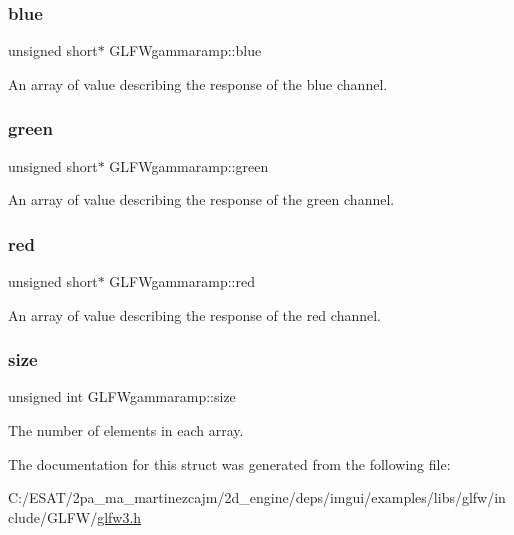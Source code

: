 \subsubsection{\texorpdfstring{blue}{blue}}
{\footnotesize\ttfamily unsigned short$\ast$ G\+L\+F\+Wgammaramp\+::blue}

An array of value describing the response of the blue channel. \mbox{\label{struct_g_l_f_wgammaramp_affccc6f5df47820b6562d709da3a5a3a}} 
\subsubsection{\texorpdfstring{green}{green}}
{\footnotesize\ttfamily unsigned short$\ast$ G\+L\+F\+Wgammaramp\+::green}

An array of value describing the response of the green channel. \mbox{\label{struct_g_l_f_wgammaramp_a2cce5d968734b685623eef913e635138}} 
\subsubsection{\texorpdfstring{red}{red}}
{\footnotesize\ttfamily unsigned short$\ast$ G\+L\+F\+Wgammaramp\+::red}

An array of value describing the response of the red channel. \mbox{\label{struct_g_l_f_wgammaramp_ad620e1cffbff9a32c51bca46301b59a5}} 
\subsubsection{\texorpdfstring{size}{size}}
{\footnotesize\ttfamily unsigned int G\+L\+F\+Wgammaramp\+::size}

The number of elements in each array. 

The documentation for this struct was generated from the following file\+:\begin{DoxyCompactItemize}
\item 
C\+:/\+E\+S\+A\+T/2pa\+\_\+ma\+\_\+martinezcajm/2d\+\_\+engine/deps/imgui/examples/libs/glfw/include/\+G\+L\+F\+W/\hyperlink{glfw3_8h}{glfw3.\+h}\end{DoxyCompactItemize}
